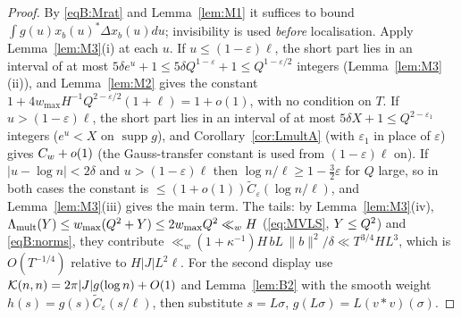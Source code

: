 \begin{proof}
By \eqref{eqB:Mrat} and Lemma~\ref{lem:M1} it suffices to bound $\int g(u)x_b(u)^*\Delta x_b(u)du$; invisibility is used \emph{before}
localisation. Apply Lemma~\ref{lem:M3}(i) at each $u$. If $u\le(1-\varepsilon)\ell$, the short part lies in an interval of at most
$5\delta e^u+1\le5\delta Q^{1-\varepsilon}+1\le Q^{1-\varepsilon/2}$ integers (Lemma~\ref{lem:M3}(ii)), and Lemma~\ref{lem:M2} gives the constant $1+4w_{\max}H^{-1}Q^{2-\varepsilon/2}(1+\ell)=1+o(1)$, with
no condition on $T$. If $u>(1-\varepsilon)\ell$, the short part lies in an interval of at most $5\delta X+1\le Q^{2-\varepsilon_1}$ integers ($e^u<X$ on $\operatorname{supp}g$), and
Corollary~\ref{cor:LmultA} (with $\varepsilon_1$ in place of $\varepsilon$) gives $C_w+o(1)$ (the Gauss-transfer constant is used from $(1-\varepsilon)\ell$ on).
If $|u-\log n|<2\delta$ and $u>(1-\varepsilon)\ell$ then $\log n/\ell\ge1-\frac32\varepsilon$ for $Q$ large, so in both cases the constant is
$\le(1+o(1))\widetilde C_\varepsilon(\log n/\ell)$, and Lemma~\ref{lem:M3}(iii) gives the main term. The tails: by Lemma~\ref{lem:M3}(iv),
$\Lambda_{\mathrm{mult}}(Y)\le w_{\max}(Q^2+Y)\le2w_{\max}Q^2\ll_wH$ (\eqref{eq:MVLS}, $Y\le Q^2$) and \eqref{eqB:norms}, they contribute
$\ll_w(1+\kappa^{-1})H\,bL\,\|b\|^2/\delta\ll T^{3/4}HL^3$, which is $O(T^{-1/4})$ relative to $H|J|L^2\ell$.
For the second display use $\mathcal{K}(n,n)=2\pi|J|g(\log n)+O(1)$ and Lemma~\ref{lem:B2} with the smooth weight
$h(s)=g(s)\widetilde C_\varepsilon(s/\ell)$, then substitute $s=L\sigma$, $g(L\sigma)=L(v*v)(\sigma)$.
\end{proof}
